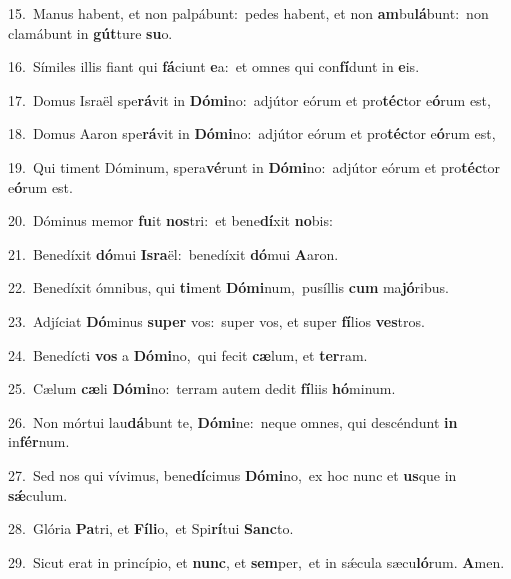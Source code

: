 {\numbfont\textcolor{\numbcolor}{15.}}~Manus habent, et non palpábunt:~\dagger pedes habent, et non \textbf{am}\-bu\-\textbf{lá}\-bunt:~\star non clamábunt in \textbf{gút}\-ture \textbf{su}\-o.\par
{\numbfont\textcolor{\numbcolor}{16.}}~Símiles illis fiant qui \textbf{fá}\-ciunt \textbf{e}\-a:~\star et omnes qui con\-\textbf{fí}\-dunt in \textbf{e}\-is.\par
{\numbfont\textcolor{\numbcolor}{17.}}~Domus Israël spe\-\textbf{rá}\-vit in \textbf{Dó}\-\textbf{mi}no:~\star adjútor eórum et pro\-\textbf{téc}\-tor e\-\textbf{ó}\-rum est,\par
{\numbfont\textcolor{\numbcolor}{18.}}~Domus Aaron spe\-\textbf{rá}\-vit in \textbf{Dó}\-\textbf{mi}no:~\star adjútor eórum et pro\-\textbf{téc}\-tor e\-\textbf{ó}\-rum est,\par
{\numbfont\textcolor{\numbcolor}{19.}}~Qui timent Dóminum, spera\-\textbf{vé}\-runt in \textbf{Dó}\-\textbf{mi}no:~\star adjútor eórum et pro\-\textbf{téc}\-tor e\-\textbf{ó}\-rum est.\par
{\numbfont\textcolor{\numbcolor}{20.}}~Dóminus memor \textbf{fu}\-it \textbf{nos}\-tri:~\star et bene\-\textbf{dí}\-xit \textbf{no}\-bis:\par
{\numbfont\textcolor{\numbcolor}{21.}}~Benedíxit \textbf{dó}\-mui \textbf{Is}\-\textbf{ra}ël:~\star benedíxit \textbf{dó}\-mui \textbf{A}\-aron.\par
{\numbfont\textcolor{\numbcolor}{22.}}~Benedíxit ómnibus, qui \textbf{ti}\-ment \textbf{Dó}\-\textbf{mi}num,~\star pusíllis \textbf{cum} ma\-\textbf{jó}\-ribus.\par
{\numbfont\textcolor{\numbcolor}{23.}}~Adjíciat \textbf{Dó}\-minus \textbf{su}\-\textbf{per} vos:~\star super vos, et super \textbf{fí}\-lios \textbf{ves}\-tros.\par
{\numbfont\textcolor{\numbcolor}{24.}}~Benedícti \textbf{vos} a \textbf{Dó}\-\textbf{mi}no,~\star qui fecit \textbf{cæ}\-lum, et \textbf{ter}\-ram.\par
{\numbfont\textcolor{\numbcolor}{25.}}~Cælum \textbf{cæ}\-li \textbf{Dó}\-\textbf{mi}no:~\star terram autem dedit \textbf{fí}\-liis \textbf{hó}\-minum.\par
{\numbfont\textcolor{\numbcolor}{26.}}~Non mórtui lau\-\textbf{dá}\-bunt te, \textbf{Dó}\-\textbf{mi}ne:~\star neque omnes, qui descéndunt \textbf{in} in\-\textbf{fér}\-num.\par
{\numbfont\textcolor{\numbcolor}{27.}}~Sed nos qui vívimus, bene\-\textbf{dí}\-cimus \textbf{Dó}\-\textbf{mi}no,~\star ex hoc nunc et \textbf{us}\-que in \textbf{sǽ}\-culum.\par
{\numbfont\textcolor{\numbcolor}{28.}}~Glória \textbf{Pa}\-tri, et \textbf{Fí}\-\textbf{li}o,~\star et Spi\-\textbf{rí}\-tui \textbf{Sanc}\-to.\par
{\numbfont\textcolor{\numbcolor}{29.}}~Sicut erat in princípio, et \textbf{nunc}\-, et \textbf{sem}\-per,~\star et in sǽcula sæcu\-\textbf{ló}\-rum. \textbf{A}\-men.\par
